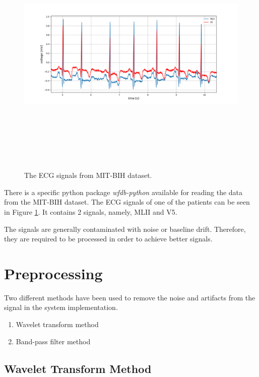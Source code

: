 \begin{figure}[h]
	\centering
	\includegraphics[width=15cm,height=12cm,keepaspectratio=true]{images/all_signals}
	\caption{
		The ECG signals from MIT-BIH dataset.
	}
	\label{fig:all_signals}
\end{figure}

There is a specific python package \textit{wfdb-python} available for reading the data from the MIT-BIH dataset. The ECG signals of one of the patients can be seen in Figure \ref{fig:all_signals}. It contains 2 signals, namely, MLII and V5.




The signals are generally contaminated with noise or baseline drift. Therefore, they are required to be processed in order to achieve better signals.


\section{Preprocessing}
Two different methods have been used to remove the noise and artifacts from the signal in the system implementation.

\begin{enumerate}
	\item Wavelet transform method
	\item Band-pass filter method
\end{enumerate}

\subsection{Wavelet Transform Method}

